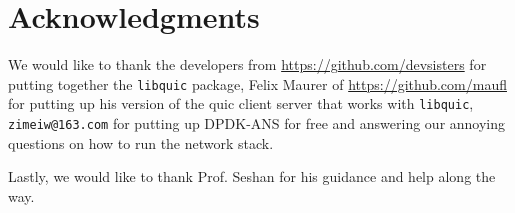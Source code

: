 \documentclass{sig-alternate-05-2015}
\begin{document}
\section{Acknowledgments}
We would like to thank the developers from \url{https://github.com/devsisters} for putting together the \texttt{libquic} package, Felix Maurer of \url{https://github.com/maufl} for putting up his version of the quic client server that works with \texttt{libquic}, \texttt{zimeiw@163.com} for putting up DPDK-ANS for free and answering our annoying questions on how to run the network stack.

Lastly, we would like to thank Prof. Seshan for his guidance and help along the way.




\end{document}
